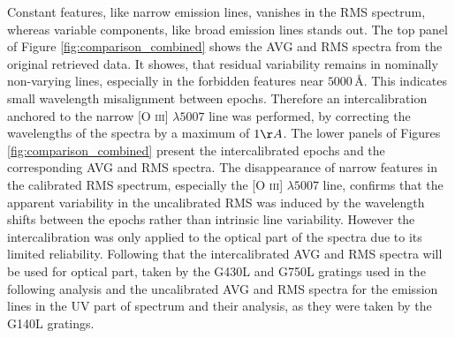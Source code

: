 Constant features, like narrow emission lines, vanishes in the RMS spectrum, whereas variable components, like broad emission lines stands out. The top panel of Figure \ref{fig:comparison_combined} shows the AVG and RMS spectra from the original retrieved data. It showes, that residual variability remains in nominally non-varying lines, especially in the forbidden features near $5000\,\text{\AA}$. This indicates small wavelength misalignment between epochs. Therefore an intercalibration anchored to the narrow [O \textsc{iii}] $\lambda5007$ line was performed, by correcting the wavelengths of the spectra by a maximum of $1\AA$. The lower panels of Figures \ref{fig:comparison_combined} present the intercalibrated epochs and the corresponding AVG and RMS spectra. The disappearance of narrow features in the calibrated RMS spectrum, especially the [O \textsc{iii}] $\lambda5007$ line, confirms that the apparent variability in the uncalibrated RMS was induced by the wavelength shifts between the epochs rather than intrinsic line variability. However the intercalibration was only applied to the optical part of the spectra  due to its limited reliability. Following that the intercalibrated AVG and RMS spectra will be used for optical part, taken by the G430L and G750L gratings used in the following analysis and the uncalibrated AVG and RMS spectra for the emission lines in the UV part of spectrum and their analysis, as they were taken by the G140L gratings. 

